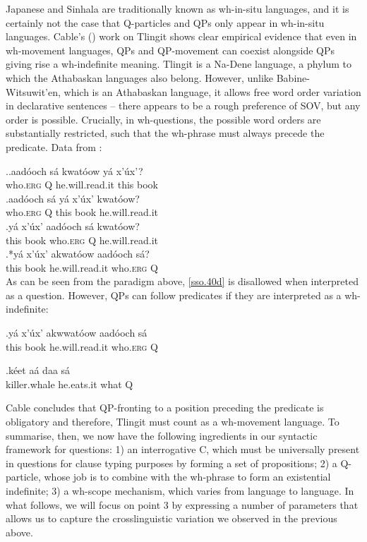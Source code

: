 \documentclass{glossa}
\begin{document}
Japanese and Sinhala are traditionally known as wh-in-situ languages, and it is certainly not the case that Q-particles and QPs only appear in wh-in-situ languages. Cable's (\citeyear{cable:2007}) work on Tlingit shows clear empirical evidence that even in wh-movement languages, QPs and QP-movement can coexist alongside QPs giving rise a wh-indefinite meaning. Tlingit is a Na-Dene language, a phylum to which the Athabaskan languages also belong. However, unlike Babine-Witsuwit'en, which is an Athabaskan language, it allows free word order variation in declarative sentences -- there appears to be a rough preference of SOV, but any order is possible. Crucially, in wh-questions, the possible word orders are substantially restricted, such that the wh-phrase must always precede the predicate. Data from \cite[63--66]{cable:2007}:

\ex.\ag.aad\'ooch s\'a kwat\'oow y\'a x'\'ux'?\\
   who.\textsc{erg} Q he.will.read.it this book\\
   \bg.aad\'ooch s\'a y\'a x'\'ux' kwat\'oow?\\
   who.\textsc{erg} Q this book he.will.read.it\\
   \bg.y\'a x'\'ux' aad\'ooch s\'a kwat\'oow?\\
   this book  who.\textsc{erg} Q he.will.read.it\\
   \bg.*\label{sso.40d}y\'a x'\'ux' akwat\'oow aad\'ooch s\'a?\\
   this book he.will.read.it who.\textsc{erg} Q\\

As can be seen from the paradigm above, \ref{sso.40d} is disallowed when interpreted as a question. However, QPs can follow predicates if they are interpreted as a wh-indefinite:

\exg.\label{sso.50}y\'a x'\'ux' akwwat\'oow aad\'ooch s\'a\\
   this book he.will.read.it who.\textsc{erg} Q\\

\exg.\label{sso.60}k\'eet a\'a daa s\'a\\
   killer.whale he.eats.it what Q\\

Cable concludes that QP-fronting to a position preceding the predicate is obligatory and therefore, Tlingit must count as a wh-movement language. To summarise, then, we now have the following ingredients in our syntactic framework for questions: 1) an interrogative C, which must be universally present in questions for clause typing purposes by forming a set of propositions; 2) a Q-particle, whose job is to combine with the wh-phrase to form an existential indefinite; 3) a wh-scope mechanism, which varies from language to language. In what follows, we will focus on point 3 by expressing a number of parameters that allows us to capture the crosslinguistic variation we observed in the previous above.
\end{document}
